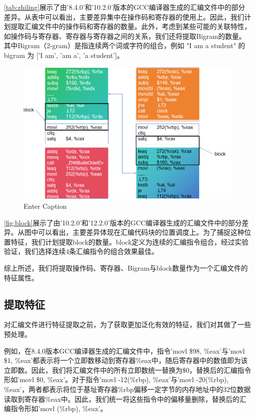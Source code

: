 \autoref{tab:zhiling}展示了由'8.4.0'和'10.2.0'版本的GCC编译器生成的汇编文件中的部分差异。从表中可以看出，主要差异集中在操作码和寄存器的使用上。因此，我们计划提取汇编文件中的操作码和寄存器的数量。此外，考虑到某些可能的关联特性，如操作码与寄存器、寄存器与寄存器之间的关系，我们还将提取Bigram的数量。其中Bigram（2-gram）是指连续两个词或字符的组合，例如 "I am a student" 的 bigram 为 ['I am', 'am a', 'a student']。
\begin{figure}
    \centering
    \includegraphics[width=1\linewidth]{figures/block.png}
    \caption{Enter Caption}
    \label{fig:block}
\end{figure}


  \autoref{fig:block}展示了由'10.2.0'和'12.2.0'版本的GCC编译器生成的汇编文件中的部分差异。从图中可以看出，主要差异体现在汇编代码块的位置调度上。为了捕捉这种位置特征，我们计划提取block的数量。block定义为连续的汇编指令组合，经过实验验证，我们选择连续4条汇编指令的组合效果最佳。

  综上所述，我们将提取操作码、寄存器、Bigram与block数量作为一个汇编文件的特征属性。
\vspace*{1cm}
  \subsection{提取特征}
  对汇编文件进行特征提取之前，为了获取更加泛化有效的特征，我们对其做了一些预处理。

  例如，在8.4.0版本GCC编译器生成的汇编文件中，指令'movl \$98, \%eax'与'movl \$1, \%eax'都表示将一个立即数移动到寄存器\%eax中，随后寄存器中的数值即为该立即数。因此，我们将汇编文件中的所有立即数统一替换为\$0，替换后的汇编指令形如'movl \$0, \%eax'。对于指令'movl -12(\%rbp), \%eax'与'movl -20(\%rbp), \%eax'，两者都表示将位于基址寄存器\%rbp偏移一定字节的内存地址中的32位数据读取到寄存器\%eax中。因此，我们统一将这些指令中的偏移量删除，替换后的汇编指令形如'movl (\%rbp), \%eax'。

